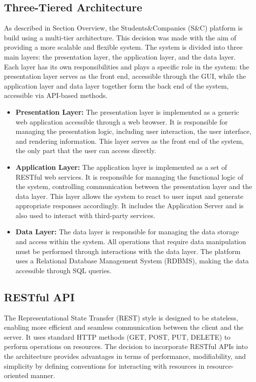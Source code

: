 \subsection{Three-Tiered Architecture}\label{subsec:three-tiered architecture}
As described in Section Overview, the Students\&Companies (S\&C) platform is build using a multi-tier architecture. This decision was made with the aim of 
providing a more scalable and flexible system.
The system is divided into three main layers: the presentation layer, the application layer, and the data layer.
Each layer has its own responsibilities and plays a specific role in the system: the presentation layer serves as the front end, accessible through the GUI, 
while the application layer and data layer together form the back end of the system, accessible via API-based methods.
\begin{itemize}
    \item \textbf{Presentation Layer:} The presentation layer is implemented as a generic web application accessible through a web browser.
    It is responsible for managing the presentation logic, including user interaction, the user interface, and rendering information.
    This layer serves as the front end of the system, the only part that the user can access directly.
    \item \textbf{Application Layer:} The application layer is implemented as a set of RESTful web services.
    It is responsible for managing the functional logic of the system, controlling communication between the presentation layer and the data layer.
    This layer allows the system to react to user input and generate appropriate responses accordingly.
    It includes the Application Server and is also used to interact with third-party services.
    \item \textbf{Data Layer:} The data layer is responsible for managing the data storage and access within the system.
    All operations that require data manipulation must be performed through interactions with the data layer.
    The platform uses a Relational Database Management System (RDBMS), making the data accessible through SQL queries.
\end{itemize}
\subsection{RESTful API}\label{subsec:restful api}
The Representational State Transfer (REST) style is designed to be stateless, enabling more efficient and seamless communication between the client and the 
server. It uses standard HTTP methods (GET, POST, PUT, DELETE) to perform operations on resources.
The decision to incorporate RESTful APIs into the architecture provides advantages in terms of performance, modifiability, and simplicity by defining conventions 
for interacting with resources in resource-oriented manner.
